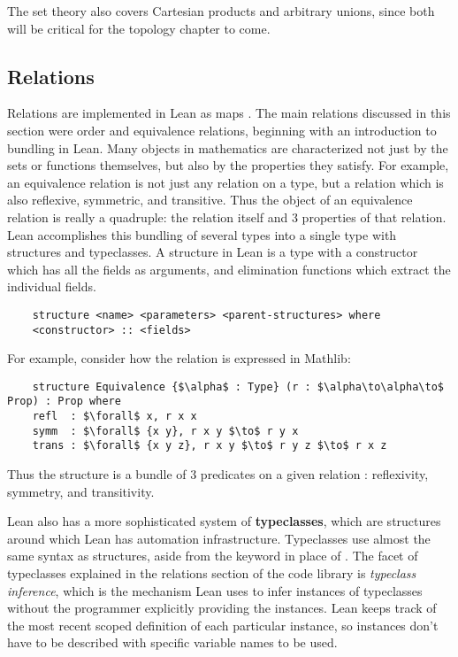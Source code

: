 The set theory also covers Cartesian products and arbitrary unions, since
both will be critical for the topology chapter to come.

\subsection{Relations}

Relations are implemented in Lean as maps . The 
main relations discussed in this section were order and equivalence relations,
beginning with an introduction to bundling in Lean. Many objects in 
mathematics are characterized not just by the sets or functions themselves,
but also by the properties they satisfy. For example, an equivalence relation
is not just any relation on a type, but a relation which is also reflexive, 
symmetric, and transitive. Thus the object of an equivalence relation is really
a quadruple: the relation itself and 3 properties of that relation. Lean accomplishes
this bundling of several types into a single type with structures and typeclasses.
A structure in Lean is a type with a constructor which has all the fields
as arguments, and elimination functions which extract the individual fields.
\begin{lstlisting}
    structure <name> <parameters> <parent-structures> where
    <constructor> :: <fields>
\end{lstlisting}
For example, consider how the  relation is expressed in Mathlib:
\begin{lstlisting}
    structure Equivalence {$\alpha$ : Type} (r : $\alpha\to\alpha\to$ Prop) : Prop where
    refl  : $\forall$ x, r x x
    symm  : $\forall$ {x y}, r x y $\to$ r y x
    trans : $\forall$ {x y z}, r x y $\to$ r y z $\to$ r x z
\end{lstlisting}
Thus the structure  is a bundle of 3 predicates on a given
relation : reflexivity, symmetry, and transitivity.

Lean also has a more sophisticated system of \textbf{typeclasses}, which are
structures around which Lean has automation infrastructure. Typeclasses use 
almost the same syntax as structures, aside from the keyword  in
place of . The facet of typeclasses explained in the relations
section of the code library is \textit{typeclass inference}, which is the
mechanism Lean uses to infer instances of typeclasses without the programmer
explicitly providing the instances. Lean keeps track of the most recent scoped 
definition of each particular instance, so instances don't have to be described
with specific variable names to be used. 

